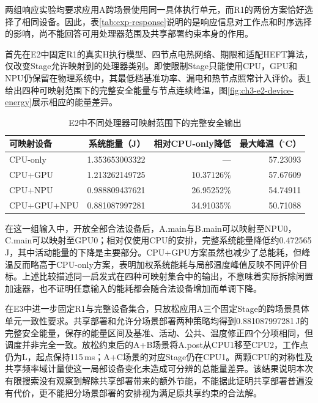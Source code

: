 两组响应实验均要求应用A跨场景使用同一具体执行单元，而R1的两份方案恰好选择了相同设备。因此，表\ref{tab:exp-response}说明的是响应信息对工作点和时序选择的影响，尚不能回答可用处理器范围及共享部署约束本身的作用。

首先在E2中固定R1的真实H执行模型、四节点电热网络、期限和适配HEFT算法，仅改变Stage允许映射到的处理器类别。即使限制Stage只能使用CPU，GPU和NPU仍保留在物理系统中，其最低档基准功率、漏电和热节点照常计入评价。表\ref{tab:exp-e2-resources}给出四种可映射范围下的完整安全能量与节点连续峰温，图\ref{fig:ch3-e2-device-energy}展示相应的能量差异。

\begin{table}[htbp]
\centering
\small
\caption{E2中不同处理器可映射范围下的完整安全输出}
\label{tab:exp-e2-resources}
\begin{tabular}{lrrr}
\toprule
可映射设备 & 系统能量（J） & 相对CPU-only降低 & 最大峰温（$^\circ$C） \\
\midrule
CPU-only & 1.353653003322 & --- & 57.23093 \\
CPU+GPU & 1.213262149725 & 10.37126\% & 57.67609 \\
CPU+NPU & 0.988809437621 & 26.95252\% & 54.74911 \\
CPU+GPU+NPU & 0.881087997281 & 34.91035\% & 50.71088 \\
\bottomrule
\end{tabular}
\end{table}


\FloatBarrier

在这一组输入中，开放全部合法设备后，A.main与B.main可以映射至NPU0，C.main可以映射至GPU0；相对仅使用CPU的安排，完整系统能量降低约0.472565\,J，其中活动能量的下降是主要部分。CPU+GPU方案虽然也减少了总能耗，但峰温反而略高于CPU-only方案，表明加权系统能耗与局部温度峰值反映不同评价目标。上述比较描述同一启发式在四种可映射集合中的输出，不意味着实际拆除闲置加速器，也不证明任意输入的能耗都会随合法设备增加而单调下降。

在E3中进一步固定R1与完整设备集合，只放松应用A三个固定Stage的跨场景具体单元一致性要求。共享部署和允许分场景部署两种策略均得到0.881087997281\,J的完整安全能量，保存的能量区间及基准、活动、公共、温度修正四个分项相同，但调度并非完全一致。放松约束后的A+B场景将A.post从CPU1移至CPU2，工作点仍为L，起点保持115\,ms；A+C场景的对应Stage仍在CPU1。两颗CPU的对称性及共享频率域计量使这一局部设备变化未造成可分辨的总能量差异。该结果说明本次有限搜索没有观察到解除共享部署带来的额外节能，不能据此证明共享部署普遍没有代价，更不能把分场景部署的安排视为满足原共享约束的合法解。

